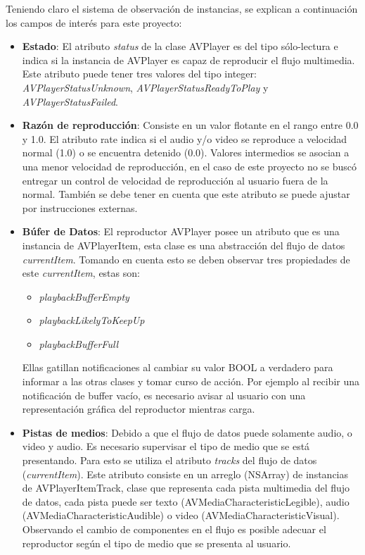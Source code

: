  
 Teniendo claro el sistema de observación de instancias, se explican a continuación los campos de interés para este proyecto:
\begin{itemize}
\item \textbf{Estado}: El atributo \textit{status} de la clase AVPlayer es del tipo sólo-lectura e indica si la instancia de AVPlayer es capaz de reproducir el flujo multimedia. Este atributo puede tener tres valores del tipo integer: \textit{AVPlayerStatusUnknown}, \textit{AVPlayerStatusReadyToPlay} y \textit{AVPlayerStatusFailed}.

\item \textbf{Razón de reproducción}: Consiste en un valor flotante en el rango entre 0.0 y 1.0. El atributo rate indica si el audio y/o video se reproduce a velocidad normal (1.0) o se encuentra detenido (0.0). Valores intermedios se asocian a una menor velocidad de reproducción, en el caso de este proyecto no se buscó entregar un control de velocidad de reproducción al usuario fuera de la normal. También se debe tener en cuenta que este atributo se puede ajustar por instrucciones externas.

\item \textbf{Búfer de Datos}: El reproductor AVPlayer posee un atributo que es una instancia de AVPlayerItem, esta clase es una abstracción del flujo de datos \textit{currentItem}. Tomando en cuenta esto se deben observar tres propiedades de este \textit{currentItem}, estas son: 
\begin{itemize}
\item \textit{playbackBufferEmpty}
\item \textit{playbackLikelyToKeepUp}
\item \textit{playbackBufferFull}
\end{itemize}
Ellas gatillan notificaciones al cambiar su valor BOOL a verdadero para informar a las otras clases y tomar curso de acción. Por ejemplo al recibir una notificación de buffer vacío, es necesario avisar al usuario con una representación gráfica del reproductor mientras carga.

\item \textbf{Pistas de medios}: Debido a que el flujo de datos puede solamente audio, o video y audio. Es necesario supervisar el tipo de medio que se está presentando. Para esto se utiliza el atributo \textit{tracks} del flujo de datos (\textit{currentItem}). Este atributo consiste en un arreglo (NSArray) de instancias de AVPlayerItemTrack, clase que representa cada pista multimedia del flujo de datos, cada pista puede ser texto (AVMediaCharacteristicLegible), audio (AVMediaCharacteristicAudible) o video (AVMediaCharacteristicVisual). Observando el cambio de componentes en el flujo es posible adecuar el reproductor según el tipo de medio que se presenta al usuario.


\end{itemize}
